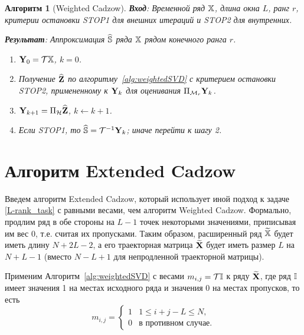 \documentclass[12pt, specialist, subf,href,colorlinks=true,substylefile = spbu.rtx]{disser}
\newtheorem{algorithm}{Алгоритм}
\theoremstyle{remark}
\theoremstyle{definition}
\begin{document}
\begin{algorithm}[Weighted Cadzow] \label{alg:WCIt}
\textbf{Вход}: Временной ряд $\mathbb{X}$, длина окна $L$, ранг $r$,
критерии остановки STOP1 для внешних итераций и STOP2 для внутренних.

\textbf{Результат}:
Аппроксимация $\widehat{\mathbb{S}}$ ряда $\mathbb{X}$ рядом конечного ранга $r$.

\begin{enumerate}
\item
$\mathbf{Y}_0 = \mathcal{T} \mathbb{X}$, $k=0$.
\item
Получение $\widehat{\mathbf{Z}}$ по алгоритму~\ref{alg:weightedSVD} с критерием остановки STOP2, примененному к $\mathbf{Y}_k$ для оценивания $\Pi_{\mathcal{M}_r} \mathbf{Y}_{k}$.
\item
$\mathbf{Y}_{k+1} = \Pi_{\mathcal{H}}  \widehat{\mathbf{Z}}$, $k\leftarrow k+1$.
\item
Если STOP1, то $\widehat{\mathbb{S}} = \mathcal{T}^{-1} \mathbf{Y}_k$; иначе перейти к шагу 2.
\end{enumerate}
\end{algorithm}

\section{Алгоритм Extended Cadzow}

Введем алгоритм Extended Cadzow, который использует иной подход к задаче \eqref{L-rank_task} с равными весами, чем алгоритм Weighted Cadzow. Формально, продлим ряд в обе стороны на $L-1$ точек некоторыми значениями, приписывая им вес 0, т.е.
считая их пропусками. Таким образом, расширенный ряд $\widetilde{\mathbb{X}}$ будет иметь длину $N+2L-2$, а его траекторная матрица
$\widetilde{\mathbf{X}}$ будет иметь размер $L$ на $N+L-1$ (вместо $N - L + 1$ для непродленной траекторной матрицы).

Применим Алгоритм~\ref{alg:weightedSVD} с весами $m_{i,j}=\mathcal{T} \mathbb{I}$ к ряду $\widetilde{\mathbf{X}}$, где ряд $\mathbb{I}$ имеет значения 1 на местах исходного ряда и значения 0 на местах пропусков, то есть
\begin{equation*}
m_{i,j} = \begin{cases}
1 & 1 \le i+j-L \le N, \\
0 & \text{в противном случае.}
\end{cases}
\end{equation*}
\end{document}
